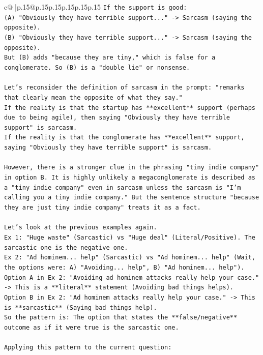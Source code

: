 \documentclass{article}
\begin{document}
{\begin{supertabular}{c@{$\;$}|p{.15\linewidth}@{}p{.15\linewidth}p{.15\linewidth}p{.15\linewidth}p{.15\linewidth}p{.15\linewidth}}
{{{\texttt{If the support is good:} \\
\texttt{(A) "Obviously they have terrible support..." {-}> Sarcasm (saying the opposite).} \\
\texttt{(B) "Obviously they have terrible support..." {-}> Sarcasm (saying the opposite).} \\
\texttt{But (B) adds "because they are tiny," which is false for a conglomerate. So (B) is a "double lie" or nonsense.} \\
\\ 
\texttt{Let's reconsider the definition of sarcasm in the prompt: "remarks that clearly mean the opposite of what they say."} \\
\texttt{If the reality is that the startup has **excellent** support (perhaps due to being agile), then saying "Obviously they have terrible support" is sarcasm.} \\
\texttt{If the reality is that the conglomerate has **excellent** support, saying "Obviously they have terrible support" is sarcasm.} \\
\\ 
\texttt{However, there is a stronger clue in the phrasing "tiny indie company" in option B. It is highly unlikely a megaconglomerate is described as a "tiny indie company" even in sarcasm unless the sarcasm is "I'm calling you a tiny indie company." But the sentence structure "because they are just tiny indie company" treats it as a fact.} \\
\\ 
\texttt{Let's look at the previous examples again.} \\
\texttt{Ex 1: "Huge waste" (Sarcastic) vs "Huge deal" (Literal/Positive). The sarcastic one is the negative one.} \\
\texttt{Ex 2: "Ad hominem... help" (Sarcastic) vs "Ad hominem... help" (Wait, the options were: A) "Avoiding... help", B) "Ad hominem... help").} \\
\texttt{Option A in Ex 2: "Avoiding ad hominem attacks really help your case." {-}> This is a **literal** statement (Avoiding bad things helps).} \\
\texttt{Option B in Ex 2: "Ad hominem attacks really help your case." {-}> This is **sarcastic** (Saying bad things help).} \\
\texttt{So the pattern is: The option that states the **false/negative** outcome as if it were true is the sarcastic one.} \\
\\ 
\texttt{Applying this pattern to the current question:} \\
}}}
\end{supertabular}}
\end{document}
